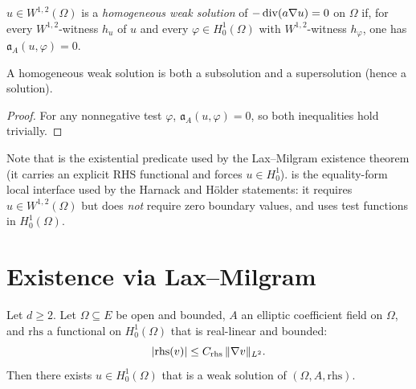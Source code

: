 \begin{definition}
\label{def:IsHomogeneousWeakSolution}
\leanok
{}
$u \in W^{1,2}(\Omega)$ is a \emph{homogeneous weak solution} of $-\operatorname{div}(a\nabla u) = 0$ on $\Omega$ if, for every $W^{1,2}$-witness $h_u$ of $u$ and every $\varphi \in H^{1}_{0}(\Omega)$ with $W^{1,2}$-witness $h_\varphi$, one has $\mathfrak{a}_A(u,\varphi) = 0$.
\end{definition}

\begin{lemma}
\label{lem:isHomogeneousWeakSolution_isSubsolution}
\leanok
{}
A homogeneous weak solution is both a subsolution and a supersolution (hence a solution).
\end{lemma}

\begin{proof}
\leanok
{}

For any nonnegative test $\varphi$, $\mathfrak{a}_A(u,\varphi) = 0$, so both inequalities hold trivially.
\end{proof}

Note that  is the existential predicate used by the Lax--Milgram existence theorem (it carries an explicit RHS functional and forces $u \in H^{1}_{0}$).  is the equality-form local interface used by the Harnack and H\"older statements: it requires $u \in W^{1,2}(\Omega)$ but does \emph{not} require zero boundary values, and uses test functions in $H^{1}_{0}(\Omega)$.

\section{Existence via Lax--Milgram}

\begin{theorem}
\label{thm:weakProblem-exists}
\leanok
{}
Let $d \geq 2$. Let $\Omega \subseteq E$ be open and bounded, $A$ an elliptic coefficient field on $\Omega$, and $\mathrm{rhs}$ a functional on $H^{1}_{0}(\Omega)$ that is real-linear and bounded:
\begin{equation*}
  |\mathrm{rhs}(v)| \leq C_{\mathrm{rhs}}\,\|\nabla v\|_{L^{2}}.
\end{equation*}
Then there exists $u \in H^{1}_{0}(\Omega)$ that is a weak solution of $(\Omega, A, \mathrm{rhs})$.
\end{theorem}

